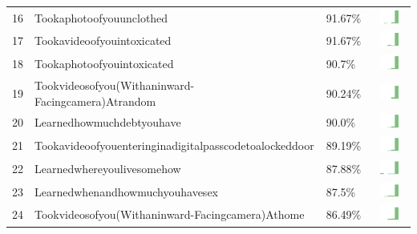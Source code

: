 \documentclass[a4paper,12pt]{article}
\begin{document}
\begin{longtable}{| p{0.5cm} | p{7cm} | p{1cm} | c |}
16 & Tookaphotoofyouunclothed & 91.67\% & \includegraphics[width = 2cm, height = 0.5cm]{tookaphotoofyouunclothedPUBLIC} \\  
17 & Tookavideoofyouintoxicated & 91.67\% & \includegraphics[width = 2cm, height = 0.5cm]{tookavideoofyouintoxicatedPUBLIC} \\  
18 & Tookaphotoofyouintoxicated & 90.7\% & \includegraphics[width = 2cm, height = 0.5cm]{tookaphotoofyouintoxicatedPUBLIC} \\  
19 & Tookvideosofyou(Withaninward-Facingcamera)Atrandom & 90.24\% & \includegraphics[width = 2cm, height = 0.5cm]{tookvideosofyou(withaninward-facingcamera)atrandomPUBLIC} \\  
20 & Learnedhowmuchdebtyouhave & 90.0\% & \includegraphics[width = 2cm, height = 0.5cm]{learnedhowmuchdebtyouhavePUBLIC} \\  
21 & Tookavideoofyouenteringinadigitalpasscodetoalockeddoor & 89.19\% & \includegraphics[width = 2cm, height = 0.5cm]{tookavideoofyouenteringinadigitalpasscodetoalockeddoorPUBLIC} \\  
22 & Learnedwhereyoulivesomehow & 87.88\% & \includegraphics[width = 2cm, height = 0.5cm]{learnedwhereyoulivesomehowPUBLIC} \\  
23 & Learnedwhenandhowmuchyouhavesex & 87.5\% & \includegraphics[width = 2cm, height = 0.5cm]{learnedwhenandhowmuchyouhavesexPUBLIC} \\  
24 & Tookvideosofyou(Withaninward-Facingcamera)Athome & 86.49\% & \includegraphics[width = 2cm, height = 0.5cm]{tookvideosofyou(withaninward-facingcamera)athomePUBLIC} \\  

\end{longtable}
\end{document}
